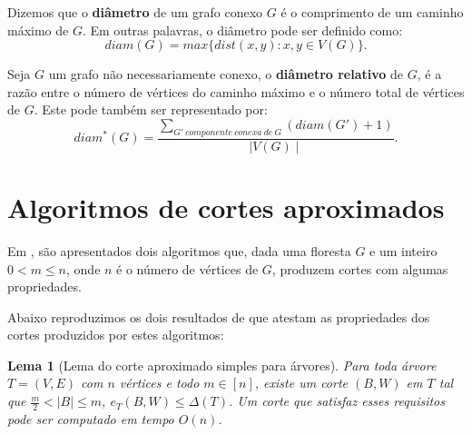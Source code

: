 \documentclass[a4paper,12pt]{article}
\newtheorem{lem}{Lema}
\begin{document}
		\bigskip
		\bigskip
		\bigskip
		\bigskip
		\bigskip
		\bigskip



		Dizemos que o \textbf{diâmetro} de um grafo conexo $G$ é o
		comprimento de um caminho máximo de $G$. 
		Em outras palavras, o diâmetro pode ser definido como:
		$$ diam(G)=max\{dist(x,y):x,y\in V(G)\}. $$

		\bigskip

		Seja $G$ um grafo não necessariamente conexo,
		o \textbf{diâmetro relativo} de $G$,
		 é a razão entre o número
		de vértices do caminho máximo e o número total de vértices
		de $G$. Este pode também ser representado por:
		$$ diam^*(G) = \frac{\displaystyle\sum_{
		G'~componente~conexa~de~G}^{}(diam(G')+1)}{\mid V(G)\mid}. $$
    
\newpage
\section {Algoritmos de cortes aproximados}

Em \cite{Schmidt15}, são apresentados dois algoritmos que, dada uma 
floresta $G$ e um inteiro $0<m\le n$, onde $n$ é o número de vértices 
de $G$, produzem cortes com algumas propriedades.

Abaixo reproduzimos os dois resultados de \cite{Schmidt15} que 
atestam as propriedades dos cortes produzidos por estes algoritmos:

\bigskip
\bigskip
\bigskip
\bigskip

\begin{lem}[Lema do corte aproximado simples para árvores]

	Para toda árvore $T=(V,E)$ com $n$ vértices e todo $m \in [n]$,
	existe um corte $(B,W)$ em $T$ tal que 
	$\frac{m}{2} <|B| \le m$,
	$e_T(B,W) \le \Delta(T)$.
	Um corte que satisfaz esses requisitos pode ser computado em
	tempo $O(n)$.
\end{lem}

\medskip
\end{document}
